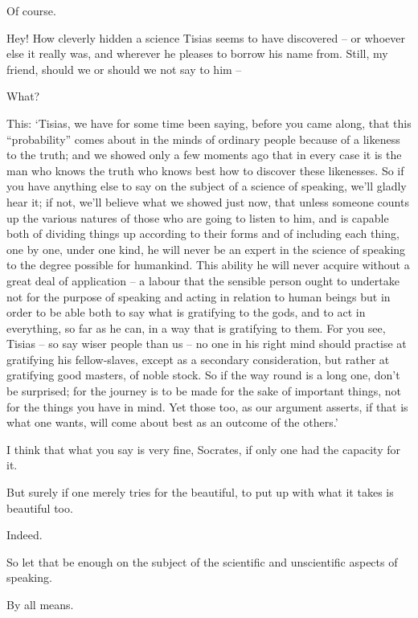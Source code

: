 Of course.

Hey! How cleverly hidden a science Tisias seems to have
discovered -- or whoever else it really was, and wherever he pleases to
borrow his name from.
Still, my friend, should  we or should we not say to him --

 What?

This: ‘Tisias, we have for some time been saying, before you
came along, that this “probability” comes about in the minds of ordinary
people because of a likeness to the truth;  and we showed only a
few moments ago that in every case it is the man who knows the truth who
knows best how to discover these likenesses. So if you have anything
else to say on the subject of a science of speaking, we'll gladly hear
it; if not, we'll believe what we showed just now, that unless someone
counts  up the various natures of those who are going to listen
to him, and is capable both of dividing
things up according to
their forms and of including each thing, one by one, under one kind, he
will never be an expert in the science of speaking to the degree
possible for humankind. This ability he will never  acquire
without a great deal of application -- a labour that the sensible person
ought to undertake not for the purpose of speaking and acting in
relation to human beings but in order to be able both to say what is
gratifying to the gods,
and to act in everything, so far as he can, in a way that is gratifying
to them. For you see, Tisias -- so say wiser people than us -- no one in
his right mind should practise at gratifying his fellow-slaves,
 except as a secondary consideration, but rather at gratifying
good masters, of noble
stock. So if the way
round is a long one, don't be surprised; for the journey is to be made
for the sake of important things, not for the things you have in mind.
Yet those too, as our argument asserts, if that is what one 
wants, will come about best as an outcome of the
others.'

I think that what you say is very fine, Socrates, if only one
had the capacity for it.

But surely if one merely tries for the
beautiful, to put up
with what it takes is beautiful too. 

Indeed.

So let that be enough on the subject of the scientific and
unscientific aspects of speaking.

By all means. 

